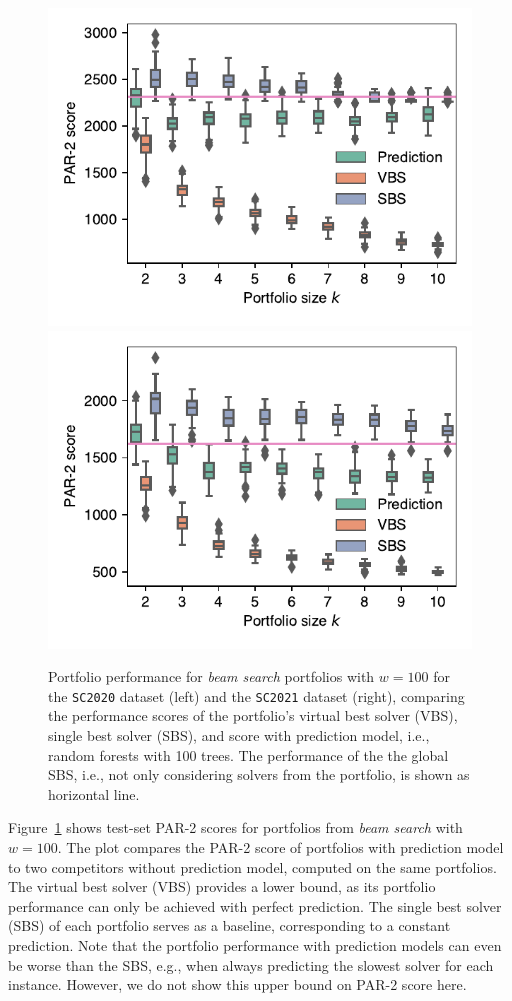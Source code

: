 \documentclass[conference]{IEEEtran}
\begin{document}
\begin{figure}[t]
	\centering
	\includegraphics[width=0.9\columnwidth]{plots/prediction-test-objective-beam-2020.pdf}
	\qquad
	\includegraphics[width=0.9\columnwidth]{plots/prediction-test-objective-beam-2021.pdf}
	\caption{Portfolio performance for \emph{beam search} portfolios with $w=100$ for the \texttt{SC2020} dataset (left) and the \texttt{SC2021} dataset (right), comparing the performance scores of the portfolio's virtual best solver (VBS), single best solver (SBS), and score with prediction model, i.e., random forests with 100 trees. 
The performance of the the global SBS, i.e., not only considering solvers from the portfolio, is shown as horizontal line.
	}
	\label{fig:prediction-test-objective-beam}
\end{figure}

Figure~\ref{fig:prediction-test-objective-beam} shows test-set PAR-2 scores for portfolios from \emph{beam search} with $w=100$.
The plot compares the PAR-2 score of portfolios with prediction model to two competitors without prediction model, computed on the same portfolios.
The virtual best solver (VBS) provides a lower bound, as its portfolio performance can only be achieved with perfect prediction.
The single best solver (SBS) of each portfolio serves as a baseline, corresponding to a constant prediction. %
Note that the portfolio performance with prediction models can even be worse than the SBS, e.g., when always predicting the slowest solver for each instance.
However, we do not show this upper bound on PAR-2 score here.
\end{document}
